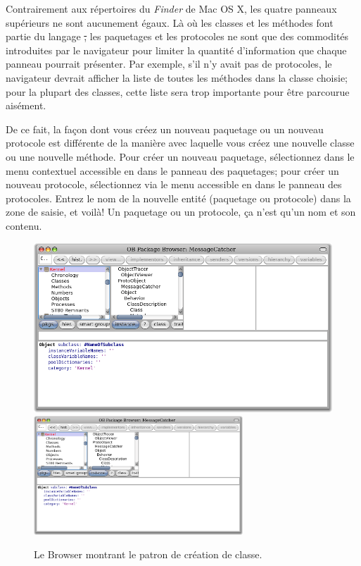 \documentclass[a4paper,10pt,twoside]{book}
\begin{document}
Contrairement aux répertoires du \emph{Finder} de Mac OS X, les quatre panneaux 
supérieurs ne sont aucunement égaux.
Là où les classes et les méthodes font partie du langage \st,
les paquetages et les protocoles ne sont que des commodités
introduites par le navigateur pour limiter la quantité d'information que chaque panneau pourrait présenter.
Par exemple, s'il n'y avait pas de protocoles, le navigateur devrait afficher
la liste de toutes les méthodes dans la classe choisie; pour la plupart des classes, 
cette liste sera trop importante pour être parcourue aisément.

De ce fait, la façon dont vous créez un nouveau paquetage ou
un nouveau protocole est différente de la manière avec laquelle
vous créez une nouvelle classe ou une nouvelle méthode. 
Pour créer un nouveau paquetage, sélectionnez 
  dans le menu contextuel accessible 
en \actclickant dans le  panneau des paquetages; 
pour créer un nouveau protocole, sélectionnez  via 
le menu accessible en \actclickant dans le panneau des protocoles.
Entrez le nom de la nouvelle entité (paquetage ou protocole) dans
la zone de saisie, et voilà! 
Un paquetage ou un protocole, ça n'est qu'un nom et son contenu.

\begin{figure}[htbp]
   \centering
   \ifluluelse
	   {\includegraphics[width=\textwidth]{SystemBrowserClassCreation}}
	   {\includegraphics[width=0.7\textwidth]{SystemBrowserClassCreation}}
   \caption{Le Browser montrant le patron de création de classe.
   }
\end{figure}
\end{document}
